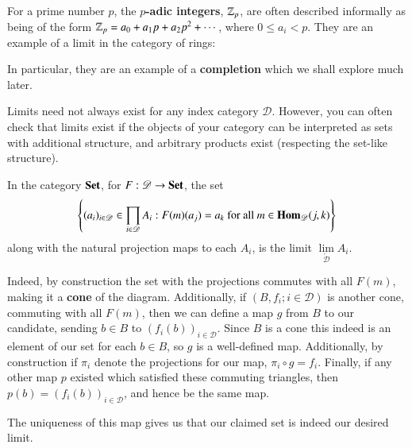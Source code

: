 \begin{example}
    For a prime number $p$, the \textbf{$p$-adic integers}, $\mathbb Z_p$, are often described informally as being of the form $\mathbb Z_p = a_0+a_1p+a_2p^2+\cdots$, where $0 \leq a_i < p$. They are an example of a limit in the category of rings:
    \begin{center}
    \end{center}
    In particular, they are an example of a \textbf{completion} which we shall explore much later.
\end{example}
Limits need not always exist for any index category $\mathscr{D}$. However, you can often check that limits exist if the objects of your category can be interpreted as sets with additional structure, and arbitrary products exist (respecting the set-like structure).

\begin{example}
    In the category $\normalfont\textbf{Set}$, for $F:\mathscr{D}\rightarrow \normalfont\textbf{Set}$, the set \begin{equation*}
        \left\{(a_i)_{i \in \mathscr{D}} \in \prod_{i \in \mathscr{D}}A_i:F(m)(a_j) = a_k\text{ for all } m \in \mathbf{Hom}_{\mathscr{D}}(j,k)\right\}
    \end{equation*}
    along with the natural projection maps to each $A_i$, is the limit $\lim\limits_{\overleftarrow{\mathscr{D}}}A_i$.

    Indeed, by construction the set with the projections commutes with all $F(m)$, making it a \textbf{cone} of the diagram. Additionally, if $(B,f_i; i \in \mathscr{D})$ is another cone, commuting with all $F(m)$, then we can define a map $g$ from $B$ to our candidate, sending $b \in B$ to $(f_i(b))_{i \in \mathscr{D}}$. Since $B$ is a cone this indeed is an element of our set for each $b \in B$, so $g$ is a well-defined map. Additionally, by construction if $\pi_i$ denote the projections for our map, $\pi_i\circ g = f_i$. Finally, if any other map $p$ existed which satisfied these commuting triangles, then $p(b) = (f_i(b))_{i \in \mathscr{D}}$, and hence be the same map.

    The uniqueness of this map gives us that our claimed set is indeed our desired limit.
\end{example}

